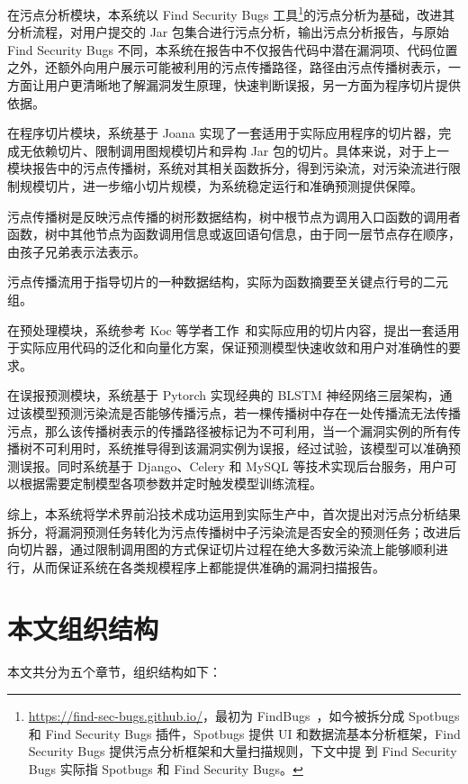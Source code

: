 在污点分析模块，本系统以 Find Security Bugs  工具\footnote{\url{https://find-sec-bugs.github.io/}，最初为 FindBugs~\cite{taint:finding}，如今被拆分成 Spotbugs 和 Find Security Bugs 插件，Spotbugs 提供 UI 和数据流基本分析框架，Find Security Bugs 提供污点分析框架和大量扫描规则，下文中提 到 Find Security Bugs 实际指 Spotbugs 和 Find Security Bugs。}的污点分析为基础，改进其分析流程，对用户提交的 Jar 包集合进行污点分析，输出污点分析报告，与原始 Find Security Bugs 不同，本系统在报告中不仅报告代码中潜在漏洞项、代码位置之外，还额外向用户展示可能被利用的污点传播路径，路径由污点传播树表示，一方面让用户更清晰地了解漏洞发生原理，快速判断误报，另一方面为程序切片提供依据。

在程序切片模块，系统基于 Joana 实现了一套适用于实际应用程序的切片器，完成无依赖切片、限制调用图规模切片和异构 Jar 包的切片。具体来说，对于上一模块报告中的污点传播树，系统对其相关函数拆分，得到污染流，对污染流进行限制规模切片，进一步缩小切片规模，为系统稳定运行和准确预测提供保障。

\begin{definition}[污点传播树]
    污点传播树是反映污点传播的树形数据结构，树中根节点为调用入口函数的调用者函数，树中其他节点为函数调用信息或返回语句信息，由于同一层节点存在顺序，由孩子兄弟表示法表示。
\end{definition}

\begin{definition}[污点传播流]
    污点传播流用于指导切片的一种数据结构，实际为函数摘要至关键点行号的二元组。
\end{definition}

在预处理模块，系统参考 Koc 等学者工作~\cite{Koc2019}和实际应用的切片内容，提出一套适用于实际应用代码的泛化和向量化方案，保证预测模型快速收敛和用户对准确性的要求。

在误报预测模块，系统基于 Pytorch 实现经典的 BLSTM 神经网络三层架构，通过该模型预测污染流是否能够传播污点，若一棵传播树中存在一处传播流无法传播污点，那么该传播树表示的传播路径被标记为不可利用，当一个漏洞实例的所有传播树不可利用时，系统推导得到该漏洞实例为误报，经过试验，该模型可以准确预测误报。同时系统基于 Django、Celery 和 MySQL 等技术实现后台服务，用户可以根据需要定制模型各项参数并定时触发模型训练流程。

综上，本系统将学术界前沿技术成功运用到实际生产中，首次提出对污点分析结果拆分，将漏洞预测任务转化为污点传播树中子污染流是否安全的预测任务；改进后向切片器，通过限制调用图的方式保证切片过程在绝大多数污染流上能够顺利进行，从而保证系统在各类规模程序上都能提供准确的漏洞扫描报告。

\section{本文组织结构}
本文共分为五个章节，组织结构如下：

